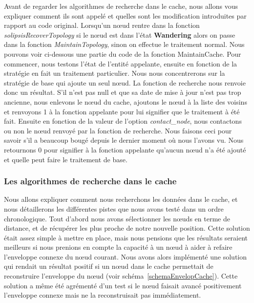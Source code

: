  Avant de regarder les algorithmes de recherche dans le cache, nous allons vous expliquer comment ils sont appelé et quelles sont les modification introduites par rapport au code original. Lorsqu'un nœud rentre dans la fonction \textit{solipsisRecoverTopology} si le nœud est dans l'état \textbf{Wandering} alors on passe dans la fonction \textit{MaintainTopology}, sinon on effectue le traitement normal. Nous pouvons voir ci-dessous une partie du code de la fonction MaintainCache. Pour commencer, nous testons l'état de l'entité appelante, ensuite en fonction de la stratégie en fait un traitement particulier. Nous nous concentrerons sur la stratégie de base qui ajoute un seul nœud. La fonction de recherche nous renvoie donc un résultat. S'il n'est pas null et que sa date de mise à jour n'est pas trop ancienne, nous enlevons le nœud du cache, ajoutons le nœud à la liste des voisins et renvoyons 1 à la fonction appelante pour lui signifier que le traitement à été fait. Ensuite en fonction de la valeur de l'option \textit{contact\_node}, nous contactons ou non le nœud renvoyé par la fonction de recherche. Nous faisons ceci pour savoir s'il a beaucoup bougé depuis le dernier moment où nous l'avons vu. Nous retournons 0 pour signifier à la fonction appelante qu'aucun nœud n'a été ajouté et quelle peut faire le traitement de base.

\lstset{numbers=left,basicstyle=\scriptsize, numberstyle=\tiny, stepnumber=5, numbersep=5pt}





\subsubsection{Les algorithmes de recherche dans le cache}
\par Nous allons expliquer comment nous recherchons les données dans le cache, et nous détaillerons les différentes pistes que nous avons testé dans un ordre chronologique. Tout d'abord nous avons sélectionner les nœuds en terme de distance, et de récupérer les plus proche de notre nouvelle position. Cette solution était assez simple à mettre en place, mais nous pensions que les résultats seraient meilleurs si nous prenions en compte la capacité à un nœud à aider à refaire l'enveloppe connexe du nœud courant. Nous avons alors implémenté une solution qui rendait un résultat positif si un nœud dans le cache permettait de reconstruire l'enveloppe du nœud (voir schéma~\ref{schemaEnvelopCache}). Cette solution a même été agrémenté d'un test si le nœud faisait avancé positivement l'enveloppe connexe mais ne la reconstruisait pas immédiatement.

